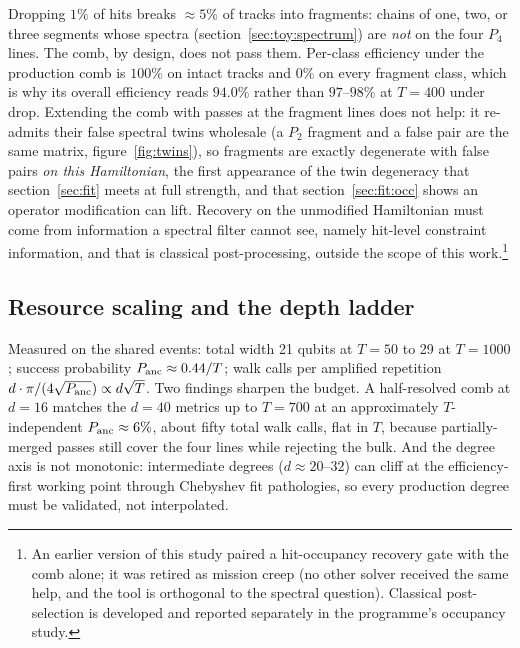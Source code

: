 \documentclass[11pt,a4paper]{article}
\begin{document}
Dropping $1\%$ of hits breaks $\approx5\%$ of tracks into fragments:
chains of one, two, or three segments whose spectra
(section~\ref{sec:toy:spectrum}) are \emph{not} on the four $P_4$
lines. The comb, by design, does not pass them. Per-class efficiency
under the production comb is $100\%$ on intact tracks and $0\%$ on
every fragment class, which is why its overall efficiency reads
$94.0\%$ rather than $97$--$98\%$ at $T=400$ under drop. Extending
the comb with passes at the fragment lines does not help: it
re-admits their false spectral twins wholesale (a $P_2$ fragment and
a false pair are the same matrix, figure~\ref{fig:twins}), so
fragments are exactly
degenerate with false pairs \emph{on this Hamiltonian}, the first
appearance of the twin degeneracy that
section~\ref{sec:fit} meets at full strength, and that
section~\ref{sec:fit:occ} shows an operator modification can
lift. Recovery on the unmodified Hamiltonian must come from
information a spectral filter
cannot see, namely hit-level constraint information, and that is
classical post-processing, outside the scope of this work.\footnote{An earlier version of this study paired a
hit-occupancy recovery gate with the comb alone; it was retired as
mission creep (no other solver received the same help, and the tool
is orthogonal to the spectral question). Classical post-selection is
developed and reported separately in the programme's occupancy
study.}

\subsection{Resource scaling and the depth ladder}
\label{sec:comb:resources}

Measured on the shared events: total width 21 qubits at $T=50$ to 29
at $T=1000$; success probability $P_{\rm anc}\approx0.44/T$; walk
calls per amplified repetition
$d\cdot\pi/(4\sqrt{P_{\rm anc}})\propto d\sqrt T$. Two findings
sharpen the budget. A half-resolved comb at $d=16$ matches the
$d=40$ metrics up to $T=700$ at an approximately $T$-independent
$P_{\rm anc}\approx6\%$, about fifty total walk calls, flat in $T$,
because partially-merged passes still cover the four lines while
rejecting the bulk. And the degree axis is not monotonic:
intermediate degrees ($d\approx20$--$32$) can cliff at the
efficiency-first working point through Chebyshev fit pathologies, so
every production degree must be validated, not interpolated.
\end{document}
